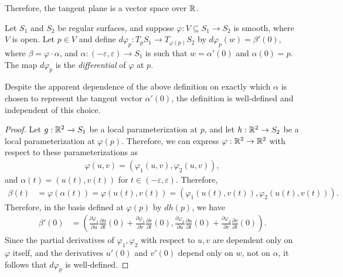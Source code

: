 \begin{cor}
    Therefore, the tangent plane is a vector space over $\mathbb{R}$.
\end{cor}

\begin{defn}
    Let $S_1$ and $S_2$ be regular surfaces, and suppose $\varphi: V \subseteq S_1 \to S_2$ is smooth, where $V$ is open. Let $p \in V$ and define $d\varphi_p: T_pS_1 \to T_{\varphi(p)}S_2$ by $d\varphi_p(w) = \beta'(0)$, where $\beta = \varphi \cdot \alpha$, and $\alpha: (-\varepsilon, \varepsilon) \to S_1$ is such that $w = \alpha'(0)$ and $\alpha(0) = p$. The map $d\varphi_p$ is the \emph{differential} of $\varphi$ at $p$.
\end{defn}

\begin{prop}
    Despite the apparent dependence of the above definition on exactly which $\alpha$ is chosen to represent the tangent vector $\alpha'(0)$, the definition is well-defined and independent of this choice.
\end{prop}

\begin{proof}
    Let $g: \mathbb{R}^2 \to S_1$ be a local parameterization at $p$, and let $h: \mathbb{R}^2 \to S_2$ be a local parameterization at $\varphi(p)$. Therefore, we can express $\varphi: \mathbb{R}^2 \to \mathbb{R}^2$ with respect to these parameterizations as
    \begin{align*}
        \varphi(u, v) = (\varphi_1(u, v), \varphi_2(u, v)),
    \end{align*}
    and $\alpha(t) = (u(t), v(t))$ for $t \in (-\varepsilon, \varepsilon)$. Therefore,
    \begin{align*}
        \beta(t) &= \varphi(\alpha(t)) = \varphi(u(t), v(t)) = \left(\varphi_1(u(t), v(t)), \varphi_2(u(t), v(t))\right).
    \end{align*}
    Therefore, in the basis defined at $\varphi(p)$ by $dh(p)$, we have
    \begin{align*}
        \beta'(0) &= \left(\frac{\partial \varphi_1}{\partial u}\frac{\partial u}{\partial t}(0) + \frac{\partial \varphi_1}{\partial v}\frac{\partial v}{\partial t}(0), \frac{\partial \varphi_2}{\partial u}\frac{\partial u}{\partial t}(0) + \frac{\partial \varphi_2}{\partial v}\frac{\partial v}{\partial t}(0)\right).
    \end{align*}
    Since the partial derivatives of $\varphi_1, \varphi_2$ with respect to $u, v$ are dependent only on $\varphi$ itself, and the derivatives $u'(0)$ and $v'(0)$ depend only on $w$, not on $\alpha$, it follows that $d\varphi_p$ is well-defined.
\end{proof}

